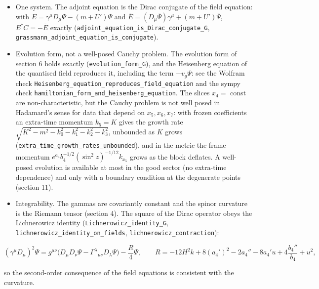 \documentclass[11pt]{article}
\begin{document}
\begin{itemize}
\item One system. The adjoint equation is the Dirac conjugate of the field equation: with $E = \gamma^\mu D_\mu\Psi - (m + U')\Psi$ and $\bar E = (D_\mu\bar\Psi)\gamma^\mu + (m + U')\bar\Psi$, $E^\dagger C = -\bar E$ exactly (\texttt{adjoint\_\allowbreak{}equation\allowbreak{}\_is\_Dira\allowbreak{}c\_conjug\allowbreak{}ate\_G}, \texttt{grassman\allowbreak{}n\_adjoin\allowbreak{}t\_equati\allowbreak{}on\_is\_co\allowbreak{}njugate}).
\item Evolution form, not a well-posed Cauchy problem. The evolution form of section 6 holds exactly (\texttt{evolutio\allowbreak{}n\_form\_G}), and the Heisenberg equation of the quantised field reproduces it, including the term $-v_g\Psi$: see the Wolfram check \texttt{Heisenbe\allowbreak{}rg\_equat\allowbreak{}ion\_repr\allowbreak{}oduces\_f\allowbreak{}ield\_equ\allowbreak{}ation} and the sympy check \texttt{hamilton\allowbreak{}ian\_form\allowbreak{}\_and\_hei\allowbreak{}senberg\_\allowbreak{}equation}. The slices $x_4 = $ const are non-characteristic, but the Cauchy problem is not well posed in Hadamard's sense for data that depend on $x_5, x_6, x_7$: with frozen coefficients an extra-time momentum $k_5 = K$ gives the growth rate $\sqrt{K^2 - m^2 - k_0^2 - k_1^2 - k_2^2 - k_3^2}$, unbounded as $K$ grows (\texttt{extra\_ti\allowbreak{}me\_growt\allowbreak{}h\_rates\_\allowbreak{}unbounde\allowbreak{}d}), and in the metric the frame momentum $e^{a_4}b_4^{-1/2}(\sin^2 z)^{-1/12}k_{x_5}$ grows as the block deflates. A well-posed evolution is available at most in the good sector (no extra-time dependence) and only with a boundary condition at the degenerate points (section 11).
\item Integrability. The gammas are covariantly constant and the spinor curvature is the Riemann tensor (section 4). The square of the Dirac operator obeys the Lichnerowicz identity (\texttt{Lichnero\allowbreak{}wicz\_ide\allowbreak{}ntity\_G}, \texttt{lichnero\allowbreak{}wicz\_ide\allowbreak{}ntity\_on\allowbreak{}\_fields}, \texttt{lichnero\allowbreak{}wicz\_con\allowbreak{}traction}):
\end{itemize}

\[
(\gamma^\mu D_\mu)^2\Psi = g^{\mu\nu}\big(D_\mu D_\nu\Psi - \Gamma^\lambda{}_{\mu\nu}D_\lambda\Psi\big) - \frac{R}{4}\Psi,\qquad R = -12H^2k + 8(a_4')^2 - 2a_4'' - 8a_4'u + 4\frac{b_4''}{b_4} + u^2,
\]

so the second-order consequence of the field equations is consistent with the curvature.
\end{document}
